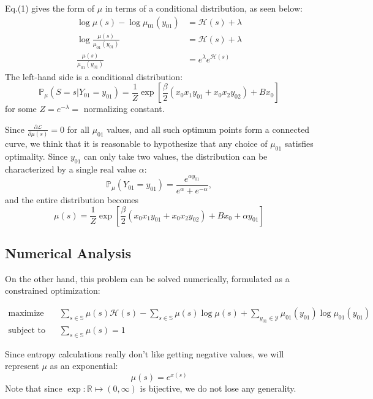 \documentclass[12pt]{article}
\numberwithin{equation}{section}
\begin{document}
Eq.(1) gives the form of $\mu$ in terms of a conditional distribution, as seen below:
\begin{align*}
    \log \mu(s) - \log \mu_{01}(y_{01})  & = \mathcal{H}(s) + \lambda     \\
    \log \frac{\mu(s)}{\mu_{01}(y_{01})} & = \mathcal{H}(s) + \lambda     \\
    \frac{\mu(s)}{\mu_{01}(y_{01})}      & = e^\lambda e^{\mathcal{H}(s)}
\end{align*}
The left-hand side is a conditional distribution:
\begin{equation}
    \mathbb{P}_\mu (S = s | Y_{01} = y_{01}) = \frac1Z \exp\left[\frac{\beta}{2}(x_0x_1y_{01} + x_0x_2y_{02}) + Bx_0\right]
\end{equation}
for some $Z = e^{-\lambda} = $ normalizing constant.

Since $\frac{\partial \mathcal{L}}{\partial \mu(s)} = 0$ for all $\mu_{01}$ values, and all such optimum points form a connected curve,
we think that it is reasonable to hypothesize that any choice of $\mu_{01}$ satisfies optimality.
Since $y_{01}$ can only take two values, the distribution can be characterized by a single real value $\alpha$:
\begin{equation*}
    \mathbb{P}_\mu(Y_{01} = y_{01}) = \frac{e^{\alpha y_{01}}}{e^\alpha + e^{-\alpha}},
\end{equation*}
and the entire distribution becomes
\begin{equation*}
    \mu(s) = \frac1Z \exp\left[\frac{\beta}{2}(x_0x_1y_{01} + x_0x_2y_{02}) + Bx_0 + \alpha y_{01}\right]
\end{equation*}

\subsection{Numerical Analysis}

On the other hand, this problem can be solved numerically, formulated as a constrained optimization:

\begin{align*}
    \text{maximize}\quad   & \sum_{s\in \mathbb{S}} \mu(s) \mathcal{H}(s) - \sum_{s\in \mathbb{S}} \mu(s) \log \mu(s) + \sum_{y_{01}\in \mathcal{Y}} \mu_{01}(y_{01}) \log\mu_{01}(y_{01}) \\
    \text{subject to}\quad & \sum_{s\in\mathbb{S}} \mu(s) = 1
\end{align*}

Since entropy calculations really don't like getting negative values, we will represent $\mu$ as an exponential:
\begin{equation*}
    \mu(s) = e^{x(s)}
\end{equation*}
Note that since $\exp: \mathbb{R} \mapsto (0, \infty)$ is bijective, we do not lose any generality.
\end{document}
